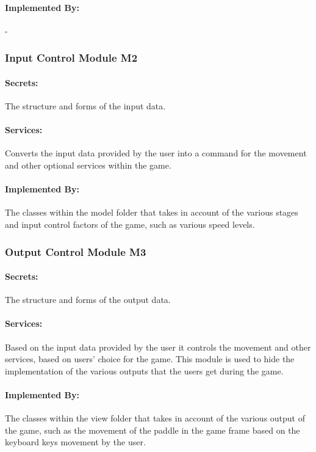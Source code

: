 \documentclass[12pt,letterpaper]{article}
\begin{document}
	\paragraph{Implemented By: } -

	\subsubsection{Input Control Module M2}
	\paragraph{Secrets: } The structure and forms of the input data.
	\paragraph{Services: } Converts the input data provided by the user into a command for the movement and other optional services within the game. 
	\paragraph{Implemented By: } The classes within the model folder that takes in account of the various stages and input control factors of the game, such as various speed levels.

	\subsubsection{Output Control Module M3}
	\paragraph{Secrets: } The structure and forms of the output data.
	\paragraph{Services: } Based on the input data provided by the user it controls the movement and other services, based on users’ choice for the game. This module is used to hide the implementation of the various outputs that the users get during the game. 
	\paragraph{Implemented By: } The classes within the view folder that takes in account of the various output of the game, such as the movement of the paddle in the game frame based on the keyboard keys movement by the user. 
\end{document}
